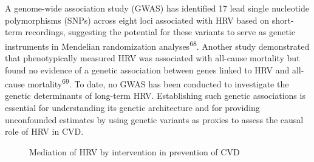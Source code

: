 \documentclass[
  a4paper,
  headsepline=true,
  open=any]{scrbook}
\begin{document}
A genome-wide association study (GWAS) has identified 17 lead single
nucleotide polymorphisms (SNPs) across eight loci associated with HRV
based on short-term recordings, suggesting the potential for these
variants to serve as genetic instruments in Mendelian randomization
analyses\textsuperscript{68}. Another study demonstrated that
phenotypically measured HRV was associated with all-cause mortality but
found no evidence of a genetic association between genes linked to HRV
and all-cause mortality\textsuperscript{69}. To date, no GWAS has been
conducted to investigate the genetic determinants of long-term HRV.
Establishing such genetic associations is essential for understanding
its genetic architecture and for providing unconfounded estimates by
using genetic variants as proxies to assess the causal role of HRV in
CVD.

\begin{figure}

\begin{minipage}[t]{\linewidth}

{\centering 


\caption{Mediation of HRV by intervention in prevention of CVD}

}

\end{minipage}%

\end{figure}
\end{document}
